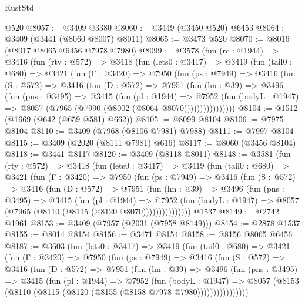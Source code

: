 \begin{lexlean}{RustStd}
\begin{coremodule}
    @520
@8057 := @3409 @3380
@8060 := @3449 (@3450 @520) @6453
@8064 := @3409 (@3441 (@8060 @8007) @8011)
@8065 := @3473 @520
@8070 := @8016 (@8017 @8065 @6456 @7978 @7980)
@8099 := @3578
    (fun (rc : @1944) =>
    @3416
      (fun (rty : @572) =>
      @3418
        (fun (lets0 : @3417) =>
        @3419
          (fun (tail0 : @680) =>
          @3421
            (fun (Γ : @3420) =>
            @7950
              (fun (ps : @7949) =>
              @3416
                (fun (S : @572) =>
                @3416
                  (fun (D : @572) =>
                  @7951
                    (fun (hn : @39) =>
                    @3496
                      (fun (pns : @3495) =>
                      @3415
                        (fun (pl : @1944) =>
                        @7952
                          (fun (bodyL : @1947) =>
                          @8057 (@7965 (@7990 (@8002 (@8064 @8070))))))))))))))))
@8104 := @1512 (@1669 (@642 (@659 @581) @662))
@8105 := @8099 @8104
@8106 := @7975 @8104
@8110 := @3409 (@7968 (@8106 @7981) @7988)
@8111 := @7997 @8104
@8115 := @3409 (@2020 (@8111 @7981) @616)
@8117 := @8060 (@3456 @8104)
@8118 := @3441 @8117
@8120 := @3409 (@8118 @8011)
@8148 := @3581
    (fun (rty : @572) =>
    @3418
      (fun (lets0 : @3417) =>
      @3419
        (fun (tail0 : @680) =>
        @3421
          (fun (Γ : @3420) =>
          @7950
            (fun (ps : @7949) =>
            @3416
              (fun (S : @572) =>
              @3416
                (fun (D : @572) =>
                @7951
                  (fun (hn : @39) =>
                  @3496
                    (fun (pns : @3495) =>
                    @3415
                      (fun (pl : @1944) =>
                      @7952
                        (fun (bodyL : @1947) =>
                        @8057 (@7965 (@8110 (@8115 (@8120 @8070)))))))))))))))
    @1537
@8149 := @2742 @1961
@8153 := @3409 (@7957 (@2031 (@7958 @8149)))
@8154 := @2878 @1537
@8155 := @8014 @8154
@8156 := @3471 @8154
@8158 := @8156 @8065 @6456
@8187 := @3603
    (fun (lets0 : @3417) =>
    @3419
      (fun (tail0 : @680) =>
      @3421
        (fun (Γ : @3420) =>
        @7950
          (fun (ps : @7949) =>
          @3416
            (fun (S : @572) =>
            @3416
              (fun (D : @572) =>
              @7951
                (fun (hn : @39) =>
                @3496
                  (fun (pns : @3495) =>
                  @3415
                    (fun (pl : @1944) =>
                    @7952
                      (fun (bodyL : @1947) =>
                      @8057 (@8153 (@8110 (@8115 (@8120 (@8155 (@8158 @7978 @7980))))))))))))))))

\end{coremodule}
\end{lexlean}
